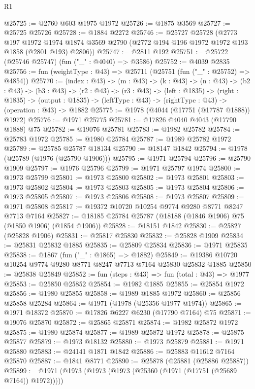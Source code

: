 \begin{lexlean}{R1}
\begin{coremodule}
@25725 := @2760 @603 @1975 @1972
@25726 := @1875 @3569
@25727 := @25725 @25726
@25728 := @1884 @2272
@25746 := @25727
    @25728
    (@2773
      @197
      @1972
      @1974
      @1874
      @3569
      @2790
      (@2772 @194 @196 @1972 @1972 @193 @1858 (@2801 @193) @2806))
@25747 := @2811 @192
@25751 := @25722 (@25746 @25747) (fun ("_" : @4040) => @3586)
@25752 := @4039 @2835
@25756 := fun (weightType : @43) => @25711 (@25751 (fun ("_" : @25752) => @4854))
@25770 := (index : @43) ->
  (m : @43) ->
  (k : @43) ->
  (n : @43) ->
  (b2 : @43) ->
  (b3 : @43) ->
  (r2 : @43) ->
  (r3 : @43) ->
  (left : @1835) ->
  (right : @1835) ->
  (output : @1835) -> (leftType : @43) -> (rightType : @43) -> (operation : @43) -> @1882
@25775 := @1978 (@4044 (@17751 (@17787 @1888)) @1972)
@25776 := @1971 @25775
@25781 := @17826 @4040 @4043 (@17790 @1888) @75
@25782 := @19076 @25781
@25783 := @1982 @25782
@25784 := @25783 @1972
@25785 := @1980 @25784
@25787 := @1989 @25782 @1972
@25789 := @25785 @25787 @18134
@25790 := @18147 @1842
@25794 := @1978 (@25789 (@1976 (@25790 @1906)))
@25795 := @1971 @25794
@25796 := @25790 @1909
@25797 := @1976 @25796
@25799 := @1971 @25797 @1974
@25800 := @1973 @25799
@25801 := @1973 @25800
@25802 := @1973 @25801
@25803 := @1973 @25802
@25804 := @1973 @25803
@25805 := @1973 @25804
@25806 := @1973 @25805
@25807 := @1973 @25806
@25808 := @1973 @25807
@25809 := @1971 @25808
@25817 := @19372 @10720 @10254 @9774 @9280 @8771 @8247 @7713 @7164
@25827 := @18185 @25784 @25787 (@18188 (@1846 @1906) @75 (@1850 @1906) (@1854 @1906))
@25828 := @18151 @1842
@25830 := @25827 (@25828 @1906)
@25831 := @25817 @25830
@25832 := @25828 @1909
@25834 := @25831 @25832 @1885
@25835 := @25809 @25834
@25836 := @1971 @25835
@25838 := @1867 (fun ("_" : @1865) => @1882)
@25849 := @19386 @10720 @10254 @9774 @9280 @8771 @8247 @7713 @7164 @25830 @25832 @1885
@25850 := @25838 @25849
@25852 := fun (steps : @43) => fun (total : @43) => @1977
@25853 := @25850 @25852
@25854 := @1982 @1885
@25855 := @25854 @1972
@25856 := @1980 @25855
@25858 := @1989 @1885 @1972
@25860 := @25856 @25858 @25284
@25864 := @1971 (@1978 (@25356 @1977 @1974))
@25865 := @1971 @18372
@25870 := @17826 @6227 @6230 (@17790 @7164) @75
@25871 := @19076 @25870
@25872 := @25865 @25871
@25874 := @1982 @25872 @1972
@25875 := @1980 @25874
@25877 := @1989 @25872 @1972
@25878 := @25875 @25877
@25879 := @1973 @18132
@25880 := @1973 @25879
@25881 := @1971 @25880
@25883 := @24141 @1871 @1842
@25886 := @25883 @11612 @7164 @25870
@25887 := @1841 @8771
@25890 := @25878 (@25881 (@25886 @25887))
@25899 := @1971 (@1973 (@1973 (@1973 (@25360 (@1971 (@17751 (@25689 @7164)) @1972)))))

\end{coremodule}
\end{lexlean}
